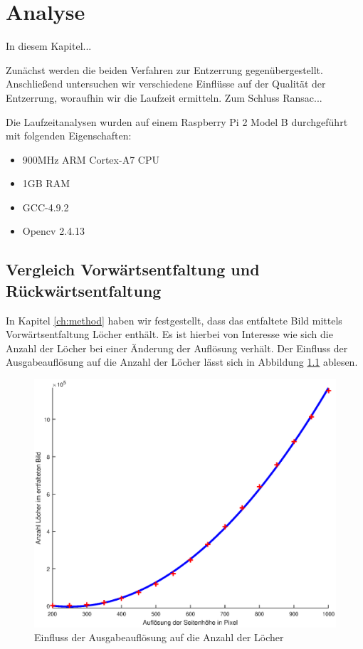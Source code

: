 \chapter{Analyse}
\label{ch:analysis}
In diesem Kapitel...

Zunächst werden die beiden Verfahren zur Entzerrung gegenübergestellt. Anschließend untersuchen wir verschiedene Einflüsse auf der Qualität der Entzerrung, woraufhin wir die Laufzeit ermitteln. 
Zum Schluss Ransac...

Die Laufzeitanalysen wurden auf einem Raspberry Pi 2 Model B durchgeführt mit folgenden Eigenschaften:
\begin{itemize}
	\item 900MHz ARM Cortex-A7 CPU
	\item 1GB RAM
	\item GCC-4.9.2
	\item Opencv 2.4.13
\end{itemize}


\section{Vergleich Vorwärtsentfaltung und Rückwärtsentfaltung}
In Kapitel \ref{ch:method} haben wir festgestellt, dass das entfaltete Bild mittels Vorwärtsentfaltung Löcher enthält. Es ist hierbei von Interesse wie sich die Anzahl der Löcher bei einer Änderung der Auflösung verhält. Der Einfluss der Ausgabeauflösung auf die Anzahl der Löcher lässt sich in Abbildung \ref{fig:influenceRes} ablesen. 

\begin{figure}[!htb]
	\centering
	\includegraphics[width=\textwidth]{images/numberOfHoles.eps}
	\caption{Einfluss der Ausgabeauflösung auf die Anzahl der Löcher}
	\label{fig:influenceRes}
\end{figure}

